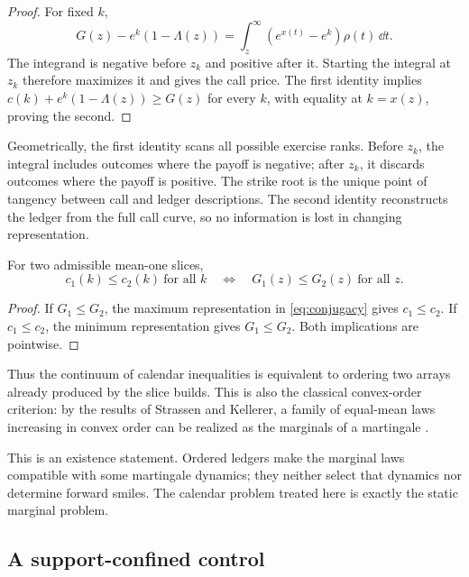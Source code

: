 \begin{proof}
For fixed $k$,
\[
G(z)-e^k(1-\Lambda(z))
=\int_z^\infty(e^{x(t)}-e^k)\rho(t)\,\dd t.
\]
The integrand is negative before $z_k$ and positive after it.  Starting the
integral at $z_k$ therefore maximizes it and gives the call price.  The first
identity implies
$c(k)+e^k(1-\Lambda(z))\ge G(z)$ for every $k$, with equality at
$k=x(z)$, proving the second.
\end{proof}

Geometrically, the first identity scans all possible exercise ranks.  Before
$z_k$, the integral includes outcomes where the payoff is negative; after
$z_k$, it discards outcomes where the payoff is positive.  The strike root is
the unique point of tangency between call and ledger descriptions.  The
second identity reconstructs the ledger from the full call curve, so no
information is lost in changing representation.

\begin{theorem}
\label{thm:ledgerorder}
For two admissible mean-one slices,
\begin{equation}
c_1(k)\le c_2(k)\ \text{for all }k
\quad\Longleftrightarrow\quad
G_1(z)\le G_2(z)\ \text{for all }z.
\label{eq:ledgerorder}
\end{equation}
\end{theorem}

\begin{proof}
If $G_1\le G_2$, the maximum representation in \eqref{eq:conjugacy} gives
$c_1\le c_2$.  If $c_1\le c_2$, the minimum representation gives
$G_1\le G_2$.  Both implications are pointwise.
\end{proof}

Thus the continuum of calendar inequalities is equivalent to ordering two
arrays already produced by the slice builds.  This is also the classical
convex-order criterion: by the results of Strassen and Kellerer, a family of
equal-mean laws increasing in convex order can be realized as the marginals of
a martingale \citep{Strassen1965,Kellerer1972}.

This is an existence statement.  Ordered ledgers make the marginal laws
compatible with some martingale dynamics; they neither select that dynamics
nor determine forward smiles.  The calendar problem treated here is exactly
the static marginal problem.

\subsection{A support-confined control}
\label{sec:calcontrol}

